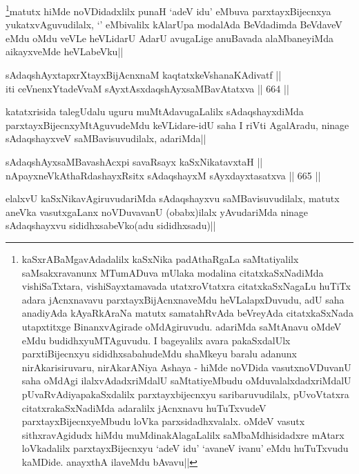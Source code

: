 \begin{artha}
\footnote{kaSxrABaMgavAdadalilx kaSxNika padAthaRgaLa saMtatiyalilx saMsakxravanunx MTumADuva mUlaka modalina citatxkaSxNadiMda vishiSaTxtara, vishiSayxtamavada utatxroVtatxra citatxkaSxNagaLu huTiTx adara jAcnxnavavu parxtayxBijAcnxnaveMdu heVLalapxDuvudu, adU saha anadiyAda kAyaRkAraNa matutx samatahRvAda beVreyAda citatxkaSxNada utapxtitxge BinanxvAgirade oMdAgiruvudu. adariMda saMtAnavu oMdeV eMdu budidhxyuMTAguvudu. I bageyalilx avara pakaSxdalUlx parxtiBijecnxyu sididhxsabahudeMdu shaMkeyu baralu adanunx nirAkarisiruvaru, nirAkarANiya Ashaya - hiMde noVDida vasutxnoVDuvanU saha oMdAgi ilalxvAdadxriMdalU saMtatiyeMbudu oMduvalalxdadxriMdalU pUvaRvAdiyapakaSxdalilx parxtayxbijecnxyu saribaruvudilalx, pUvoVtatxra citatxrakaSxNadiMda adaralilx jAcnxnavu huTuTxvudeV parxtayxBijecnxyeMbudu loVka parxsidadhxvalalx. oMdeV vasutx sithxravAgidudx hiMdu muMdinakAlagaLalilx saMbaMdhisidadxre mAtarx loVkadalilx parxtayxBijecnxyu `adeV idu'  `avaneV ivanu' eMdu huTuTxvudu kaMDide. anayxthA ilaveMdu bAvavu||}matutx hiMde noVDidadxlilx punaH `adeV idu' eMbuva parxtayxBijecnxya yukatxvAguvudilalx, `\stext' eMbivalilx kAlarUpa modalAda BeVdadimda BeVdaveV eMdu oMdu veVLe heVLidarU AdarU avugaLige anuBavada alaMbaneyiMda aikayxveMde heVLabeVku||
\end{artha}


\begin{shl}
sAdaqshAyxtapxrXtayxBijAcnxnaM kaqtatxkeVshanaKAdivatf || \\
iti ceVnenxYtadeVvaM sAyxtAsxdaqshAyxsaMBavAtatxva ||  664 ||  
\end{shl}

\begin{artha}
katatxrisida talegUdalu uguru muMtAdavugaLalilx sAdaqshayxdiMda parxtayxBijecnxyMtAguvudeMdu keVLidare-idU saha I riVti AgalAradu, ninage sAdaqshayxveV saMBavisuvudilalx, adariMda||
\end{artha}


\begin{shl}
sAdaqshAyxsaMBavashAcxpi savaRsayx kaSxNikatavxtaH ||  \\
nApayxneVkAthaRdashayxRsitx sAdaqshayxM sAyxdayxtasatxva ||  665 ||  
\end{shl}

\begin{artha}
elalxvU kaSxNikavAgiruvudariMda sAdaqshayxvu saMBavisuvudilalx, matutx aneVka vasutxgaLanx noVDuvavanU (obabx)ilalx yAvudariMda ninage sAdaqshayxvu sididhxsabeVko(adu sididhxsadu)||
\end{artha}

